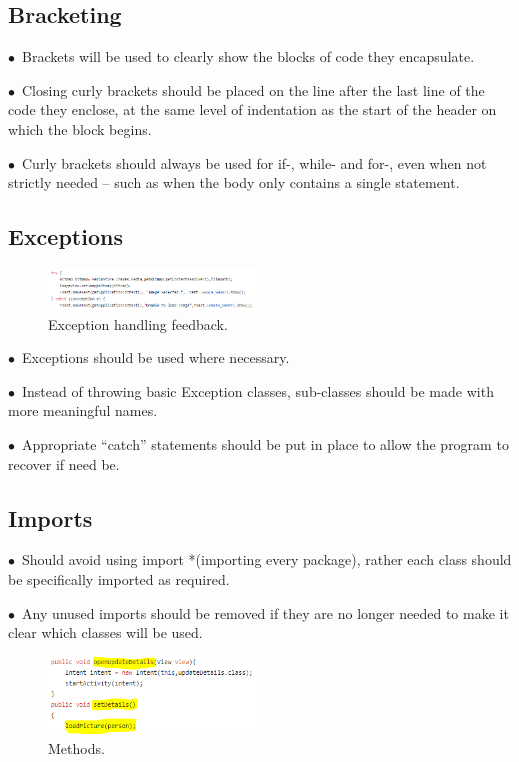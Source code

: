 \documentclass[english]{article}
\begin{document}
				\subsection{Bracketing}
$\bullet$\ Brackets will be used to clearly show the blocks of code they encapsulate.\par
$\bullet$\ Closing curly brackets should be placed on the line after the last line of the code they enclose, at the same level of indentation as the start of the header on which the block begins. \par
$\bullet$\ Curly brackets should always be used for if-, while- and for-, even when not strictly needed – such as when the body only contains a single statement.\par
\newpage
\subsection{Exceptions}
\begin{figure}
	\caption{Exception handling feedback.}
	\label{wrap-fig:3}
	\includegraphics[width=5.5cm]{images/exception.png}
\end{figure} 
$\bullet$\ Exceptions should be used where necessary.\par
$\bullet$\ Instead of throwing basic Exception classes, sub-classes should be made with more meaningful names.\par
$\bullet$\ Appropriate “catch” statements should be put in place to allow the program to recover if need be.\par

\subsection{Imports}
$\bullet$\ Should avoid using import *(importing every package), rather each class should be specifically imported as required.\par

$\bullet$\ Any unused imports should be removed if they are no longer needed to make it clear which classes will be used.\par
\begin{figure}
	\caption{Methods.}
	\label{wrap-fig:}
	\includegraphics[width=5.5cm]{images/methods.png}
\end{figure}
\end{document}
